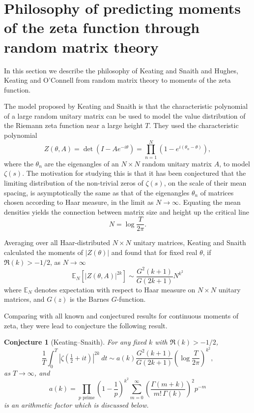\documentclass[12pt,a4paper,reqno]{amsart}
\newtheorem{conjecture}[theorem]{Conjecture}
\theoremstyle{remark}
\numberwithin{equation}{section}
\begin{document}
\section{Philosophy of predicting moments of the zeta function through random matrix theory}\label{sect:PreviousRMTresults}
In this section we describe the philosophy of Keating and Snaith \cite{KS00a} and Hughes, Keating and O'Connell \cite{HKO00} from random matrix theory to moments of the zeta function. 

The model proposed by Keating and Snaith \cite{KS00a} is that the characteristic polynomial of a large random unitary matrix can be used to model the value distribution of the Riemann zeta function near a large height $T$. They used the characteristic polynomial
\begin{equation} \label{ZTheta}
    Z(\theta,A) = \det (I - A e^{-i \theta}) = \prod_{n=1}^{N} (1-e^{i(\theta_n - \theta)}),
\end{equation}
where the $\theta_n$ are the eigenangles of an $N \times N$ random unitary matrix $A$, to model $\zeta (s)$. The motivation for studying this is that it has been conjectured that the limiting distribution of the non-trivial zeros of $\zeta (s)$, on the scale of their mean spacing, is asymptotically the same as that of the eigenangles $\theta_n$ of matrices chosen according to Haar measure, in the limit as $N \to \infty$. Equating the mean densities yields the connection between matrix size and height up the critical line
\begin{equation*}
    N = \log \frac{T}{2 \pi}.
\end{equation*}

Averaging over all Haar-distributed $N\times N$ unitary matrices, Keating and Snaith \cite{KS00a} calculated the moments of $|Z(\theta)|$ and found that for fixed real $\theta$, if $\Re(k)>-1/2$, as $N\to\infty$
\begin{equation*}
\mathbb{E}_N \left[ |Z(\theta,A)|^{2k} \right] \sim \frac{G^2 (k+1)}{G(2k+1)} N^{k^2}
\end{equation*}
where $\mathbb{E}_N$ denotes expectation with respect to Haar measure on $N\times N$ unitary matrices, and $G(z)$ is the Barnes $G$-function.

Comparing with all known and conjectured results for continuous moments of zeta, they were lead to conjecture the following result.
\begin{conjecture}[Keating--Snaith]
For any fixed $k$ with $\Re (k) > -1/2$,
\begin{equation*}
    \frac{1}{T} \int_{0}^{T} \left|\zeta \left(\tfrac{1}{2} + it \right) \right|^{2k} \ dt \sim a(k) \frac{G^2 (k+1)}{G(2k+1)} \left( \log \frac{T}{2\pi} \right)^{k^2},
\end{equation*}
as $T \rightarrow \infty$, and
\begin{equation}\label{AF}
    a(k) = \prod_{p \text{ prime}} \left( 1 - \frac{1}{p} \right)^{k^2} \sum_{m=0}^{\infty} \left( \frac{\Gamma (m+k)}{m! \, \Gamma (k)} \right)^2 p^{-m}
\end{equation}
is an arithmetic factor which is discussed below.
\end{conjecture}
\end{document}
